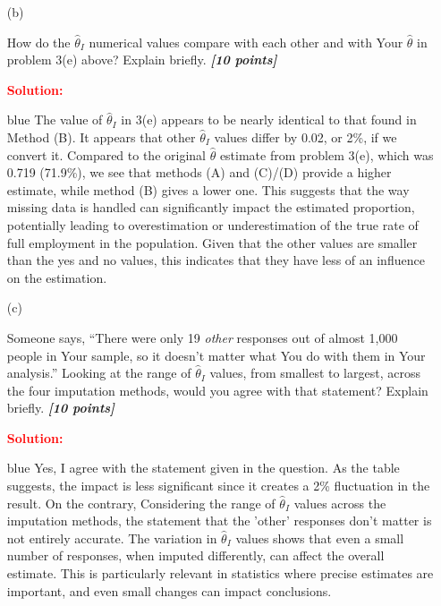 \documentclass[12pt]{article}
\newcommand{\bi}[1]{\b{\i{#1}}}
\renewcommand{\b}[1]{\textbf{#1}}
\renewcommand{\i}[1]{\textit{#1}}
\begin{document}
\begin{itemize}
\begin{itemize}
\item[(b)]

How do the $\hat{ \theta }_I$ numerical values compare with each other and with Your $\hat{ \theta }$ in problem 3(e) above? Explain briefly. \bi{[10 points]}

\textbf{\textcolor{red}{Solution:}}
\begin{Solution4}{blue}
The value of \textbf{$\hat{ \theta }_I$} in 3(e) appears to be nearly identical to that found in Method (B).
It appears that other $\hat{ \theta }_I$ values differ by 0.02, or 2\%, if we convert it.
Compared to the original $\hat{ \theta }$ estimate from problem 3(e), which was 0.719 (71.9\%), we see that methods (A) and (C)/(D) provide a higher estimate, while method (B) gives a lower one. This suggests that the way missing data is handled can significantly impact the estimated proportion, potentially leading to overestimation or underestimation of the true rate of full employment in the population.
Given that the other values are smaller than the yes and no values, this indicates that they have less of an influence on the estimation.
\end{Solution4}

\vspace*{1.0in}

\item[(c)]

Someone says, ``There were only 19 \textit{other} responses out of almost 1,000 people in Your sample, so it doesn't matter what You do with them in Your analysis.'' Looking at the range of $\hat{ \theta }_I$ values, from smallest to largest, across the four imputation methods, would you agree with that statement? Explain briefly. \bi{[10 points]}

\textbf{\textcolor{red}{Solution:}}
\begin{Solution4}{blue}
Yes, I agree with the statement given in the question. As the table suggests, the impact is less significant since it creates a 2\% fluctuation in the result. On the contrary, Considering the range of $\hat{ \theta }_I$ values across the imputation methods, the statement that the ’other’ responses don’t matter is not entirely accurate. The variation in $\hat{ \theta }_I$ values shows that even a small number of responses, when imputed differently, can affect the overall estimate. This is particularly relevant in statistics where precise estimates are important, and even small changes can impact conclusions.
\end{Solution4}


\end{itemize}
\end{itemize}
\end{document}
